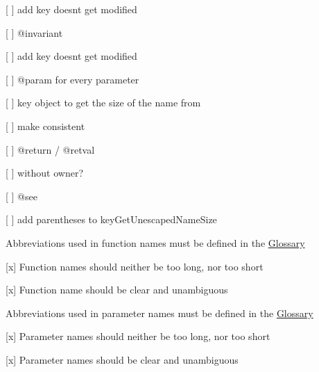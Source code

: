 \begin{DoxyItemize}
\begin{DoxyItemize}
\item \mbox{[} \mbox{]} add \textquotesingle{}key doesn\textquotesingle{}t get modified\textquotesingle{}
\end{DoxyItemize}
\item \mbox{[} \mbox{]} {\ttfamily @invariant}
\begin{DoxyItemize}
\item \mbox{[} \mbox{]} add \textquotesingle{}key doesn\textquotesingle{}t get modified\textquotesingle{}
\end{DoxyItemize}
\item \mbox{[} \mbox{]} {\ttfamily @param} for every parameter
\begin{DoxyItemize}
\item \mbox{[} \mbox{]} \textquotesingle{}key object to get the size of the name from\textquotesingle{}
\item \mbox{[} \mbox{]} make consistent
\end{DoxyItemize}
\item \mbox{[} \mbox{]} {\ttfamily @return} / {\ttfamily @retval}
\begin{DoxyItemize}
\item \mbox{[} \mbox{]} without owner?
\end{DoxyItemize}
\item \mbox{[} \mbox{]} {\ttfamily @see}
\begin{DoxyItemize}
\item \mbox{[} \mbox{]} add parentheses to key\+Get\+Unescaped\+Name\+Size
\end{DoxyItemize}
\end{DoxyItemize}


\begin{DoxyItemize}
\item Abbreviations used in function names must be defined in the \hyperlink{doc_help_elektra-glossary_md}{Glossary}
\item \mbox{[}x\mbox{]} Function names should neither be too long, nor too short
\item \mbox{[}x\mbox{]} Function name should be clear and unambiguous
\item Abbreviations used in parameter names must be defined in the \hyperlink{doc_help_elektra-glossary_md}{Glossary}
\item \mbox{[}x\mbox{]} Parameter names should neither be too long, nor too short
\item \mbox{[}x\mbox{]} Parameter names should be clear and unambiguous
\end{DoxyItemize}


